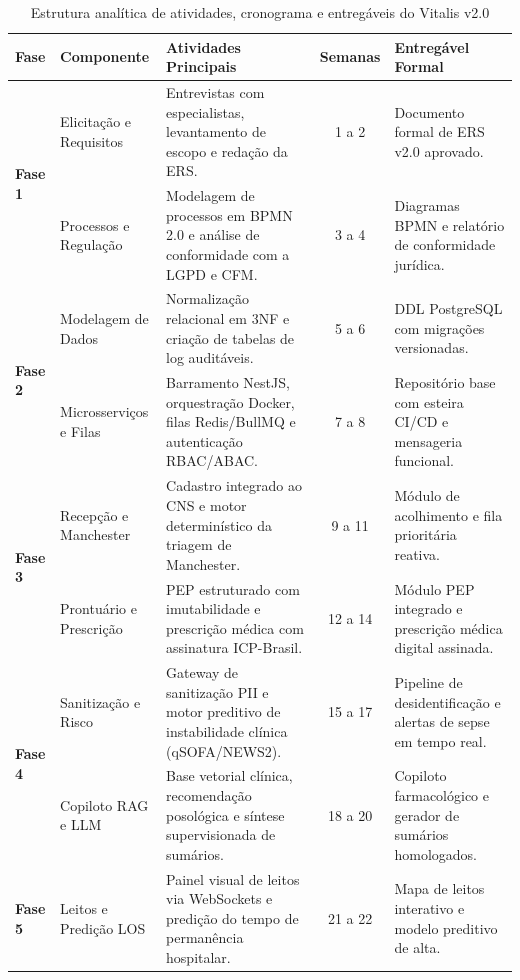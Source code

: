 \begin{table}[H]
\centering
\scriptsize
\caption{Estrutura analítica de atividades, cronograma e entregáveis do Vitalis v2.0}
\label{tab:cronograma_vitalis}
\begin{tabularx}{\textwidth}{l >{\raggedright\arraybackslash}p{2.8cm} >{\raggedright\arraybackslash}X c >{\raggedright\arraybackslash}p{3.5cm}}
\toprule
\textbf{Fase} & \textbf{Componente} & \textbf{Atividades Principais} & \textbf{Semanas} & \textbf{Entregável Formal} \\
\midrule
\multirow{2}{*}{\textbf{Fase 1}} & Elicitação e Requisitos & Entrevistas com especialistas, levantamento de escopo e redação da ERS. & 1 a 2 & Documento formal de ERS v2.0 aprovado. \\
\cmidrule(lr){2-5}
 & Processos e Regulação & Modelagem de processos em BPMN 2.0 e análise de conformidade com a LGPD e CFM. & 3 a 4 & Diagramas BPMN e relatório de conformidade jurídica. \\
\midrule
\multirow{2}{*}{\textbf{Fase 2}} & Modelagem de Dados & Normalização relacional em 3NF e criação de tabelas de log auditáveis. & 5 a 6 & DDL PostgreSQL com migrações versionadas. \\
\cmidrule(lr){2-5}
 & Microsserviços e Filas & Barramento NestJS, orquestração Docker, filas Redis/BullMQ e autenticação RBAC/ABAC. & 7 a 8 & Repositório base com esteira CI/CD e mensageria funcional. \\
\midrule
\multirow{2}{*}{\textbf{Fase 3}} & Recepção e Manchester & Cadastro integrado ao CNS e motor determinístico da triagem de Manchester. & 9 a 11 & Módulo de acolhimento e fila prioritária reativa. \\
\cmidrule(lr){2-5}
 & Prontuário e Prescrição & PEP estruturado com imutabilidade e prescrição médica com assinatura ICP-Brasil. & 12 a 14 & Módulo PEP integrado e prescrição médica digital assinada. \\
\midrule
\multirow{2}{*}{\textbf{Fase 4}} & Sanitização e Risco & Gateway de sanitização PII e motor preditivo de instabilidade clínica (qSOFA/NEWS2). & 15 a 17 & Pipeline de desidentificação e alertas de sepse em tempo real. \\
\cmidrule(lr){2-5}
 & Copiloto RAG e LLM & Base vetorial clínica, recomendação posológica e síntese supervisionada de sumários. & 18 a 20 & Copiloto farmacológico e gerador de sumários homologados. \\
\midrule
\multirow{2}{*}{\textbf{Fase 5}} & Leitos e Predição LOS & Painel visual de leitos via WebSockets e predição do tempo de permanência hospitalar. & 21 a 22 & Mapa de leitos interativo e modelo preditivo de alta. \\

\end{tabularx}
\end{table}
